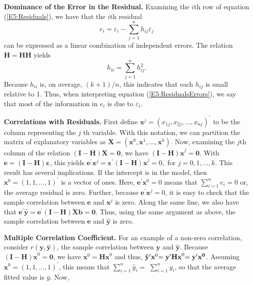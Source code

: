 \textbf{Dominance of the Error in the Residual.} Examining the $i$th
row of equation (\ref{E5:Residuals}), we have that the $i$th
residual
\begin{equation}\label{E5:ResidualsErrors}
e_i=\varepsilon_i - \sum_{j=1}^{n} h_{ij} \varepsilon_j
\end{equation}
can be expressed as a linear combination of independent errors. The
relation $ \mathbf{H}=\mathbf{HH}$ yields
\begin{equation}\label{E5:Leverages}
h_{ii}=\sum_{j=1}^{n} h_{ij}^2.
\end{equation}
Because $h_{ii}$ is, on average, $(k+1)/n$, this indicates that each
$h_{ij}$ is small relative to 1. Thus, when interpreting equation
(\ref{E5:ResidualsErrors}), we say that most of the information in
$e_i$ is due to $\varepsilon_i$.

\textbf{Correlations with Residuals.} First define
$\mathbf{x}^j=(x_{1j},x_{2j},\dots,x_{nj})^{\prime}$ to be the
column representing the $j$ th variable. With this notation, we can
partition the matrix of explanatory variables as $\mathbf{X}=\left(
\mathbf{x}^{0},\mathbf{x}^{1},\dots,\mathbf{x}^{k} \right)$. Now,
examining the $j$th column of the relation $\mathbf{(I-H)X}=
\mathbf{0}$, we have $\mathbf{(I-H)x}^{j}=\mathbf{0}$. With
$\mathbf{e}=\mathbf{(I-H) \boldsymbol \varepsilon}$, this yields $
\mathbf{e}^{\prime}\mathbf{x}^{j}=\boldsymbol
\varepsilon^{\prime}\mathbf{(I-H)x} ^{j}=0,$ for $j=0,1,\ldots,k.$
This result has several implications. If the intercept is in the
model, then $\mathbf{x}^{0}=(1,1,\ldots,1)^{\prime}$ is a vector of
ones. Here, $\mathbf{e}^{\prime}\mathbf{x}^{0}=0$ means that
$\sum_{i=1}^{n} e_i=0$ or, the average residual is zero. Further,
because $\mathbf{e}^{\prime} \mathbf{x}^{j}=0$, it is easy to check
that the sample correlation between $\mathbf{e}$ and
$\mathbf{x}^{j}$ is zero. Along the same line, we also have that
$\mathbf{e}^{\prime}\mathbf{\hat{y}}=\mathbf{e}^{\prime}
\mathbf{(I-H)Xb}=\mathbf{0}$. Thus, using the same argument as
above, the sample correlation between $\mathbf{e}$ and
$\mathbf{\hat{y}}$ is zero.


\textbf{Multiple Correlation Coefficient.} For an example of a
non-zero correlation, consider $r(\mathbf{y,\hat{y}})$, the sample
correlation
between $\mathbf{y}$ and $\mathbf{\hat{y}}$. Because $\mathbf{(I-H)x}^{0}=%
\mathbf{0}$, we have $\mathbf{x}^{0}=\mathbf{Hx}^{0}$ and thus, $\mathbf{%
\hat{y}}^{\prime}\mathbf{x}^{0}\mathbf{=y}^{\prime}\mathbf{Hx}^{0}\mathbf{%
=y^{\prime} x^{0}}$. Assuming
$\mathbf{x}^{0}=(1,1,\ldots,1)^{\prime}$, this means that
$\sum_{i=1}^{n}\hat{y}_i=$ $\sum_{i=1}^{n}y_i$, so that the average
fitted value is $\bar{y}$. Now,

